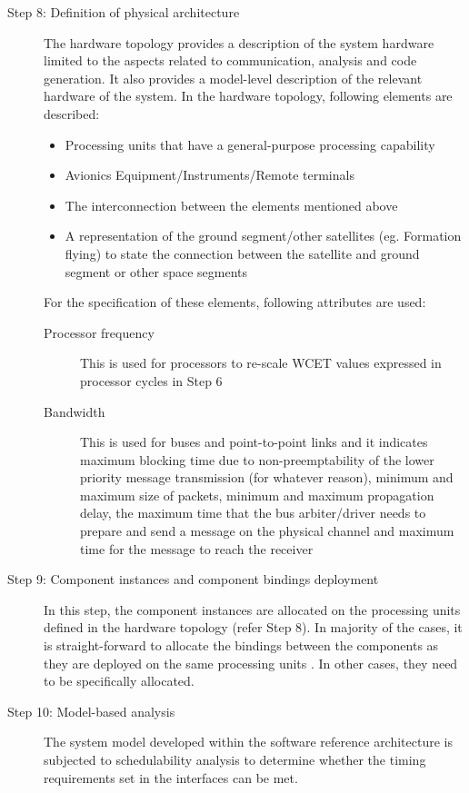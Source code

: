 \begin{description}
\item [Step 8: Definition of physical architecture] The hardware topology provides a description of the system hardware limited to the aspects related to communication, analysis and code generation. It also provides a model-level description of the relevant hardware of the system. In the hardware topology, following elements are described:
\begin{itemize}
\item Processing units that have a general-purpose processing capability
\item Avionics Equipment/Instruments/Remote terminals
\item The interconnection between the elements mentioned above 
\item A representation of the ground segment/other satellites (eg. Formation flying) to state the connection between the satellite and ground segment or other space segments
\end{itemize}		
For the specification of these elements, following attributes are used:
\begin{description}
\item [Processor frequency] This is used for processors to re-scale WCET values expressed in processor cycles in Step 6
\item [Bandwidth] This is used for buses and point-to-point links and it indicates maximum blocking time due to non-preemptability of the lower priority message transmission (for whatever reason), minimum and maximum size of packets, minimum and maximum propagation delay, the maximum time that the bus arbiter/driver needs to prepare and send a message on the physical channel and maximum time for the message to reach the receiver    
\end{description}

\item [Step 9: Component instances and component bindings deployment] In this step, the component instances are allocated on the processing units defined in the hardware topology (refer Step 8). In majority of the cases, it is straight-forward to allocate the bindings between the components as they are deployed on the same processing units \cite{CompBasedProcess}. In other cases, they need to be specifically allocated.

\item [Step 10: Model-based analysis] The system model developed within the software reference architecture is subjected to schedulability analysis to determine whether the timing requirements set in the interfaces can be met.


\end{description}
